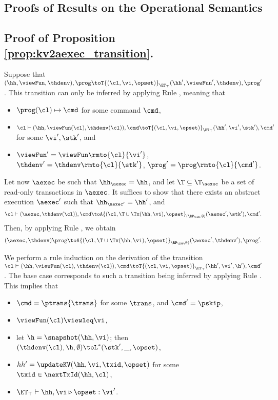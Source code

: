 \subsection{Proofs of Results on the Operational Semantics}

\subsection{Proof of Proposition \ref{prop:kv2aexec_transition}.}
\label{sec:kv2aexec-transaction}

Suppose that $(\hh, \viewFun, \thdenv), \prog \toT{(\cl, \vi, \opset)}_{\ET_{\top}} (\hh', \viewFun', \thdenv), \prog'$. 
This transition can only be inferred by applying Rule , meaning that 
\begin{itemize}
\item $\prog(\cl) \mapsto \cmd$ for some command $\cmd$, 
\item $\cl \vdash (\hh, \viewFun(\cl), \thdenv(\cl)), \cmd \toT{(\cl, \vi, \opset)}_{\ET_{\top}} (\hh', \vi', \stk'), \cmd'$ 
for some $\vi', \stk'$, and 
\item $\viewFun' = \viewFun\rmto{\cl}{\vi'}$, $\thdenv' = \thdenv\rmto{\cl}{\stk'}$, $\prog' = \prog\rmto{\cl}{\cmd'}$. 
\end{itemize}
Let now $\aexec$ be such that $\hh_{\aexec} = \hh$, and let $\T \subseteq \T_{\aexec}$ be a set of read-only 
transactions in $\aexec$. It suffices to show that there exists an abstract execution $\aexec'$ such that 
$\hh_{\aexec'} = \hh'$, and 
\[
\cl \vdash (\aexec, \thdenv(\cl)), \cmd \toA{(\cl, \T \cup \Tx(\hh, \vi), \opset}_{(\RP_{\LWW}, \emptyset)} (\aexec', \stk'), \cmd'.
\]
Then, by applying Rule , we obtain 
\[ 
(\aexec, \thdenv) \prog \toA{(\cl, \T \cup \Tx(\hh,\vi), \opset)}_{\RP_{\LWW}, \emptyset)} (\aexec' ,\thdenv'), \prog'.
\]

We perform a rule induction on the derivation of the transition $\cl \vdash (\hh, \viewFun(\cl), \thdenv(\cl)), \cmd \toT{(\cl, \vi, \opset)}_{\ET_{\top}} (\hh', \vi', \h'), \cmd'$. 
The base case corresponds to such a transition being inferred by applying Rule . 
This implies that 
\begin{itemize}
\item $\cmd = \ptrans{\trans}$ for some $\trans$, and $\cmd' = \pskip$,
\item $\viewFun(\cl) \viewleq \vi$, 
\item let $\h = \snapshot(\hh, \vi)$; then $(\thdenv(\cl), \h, \emptyset) \toL^{\ast} (\stk', \_, \opset)$, 
\item $hh' = \updateKV(\hh, \vi, \txid, \opset)$ for some $\txid \in \nextTxId(\hh, \cl)$, 
\item $\ET_{\top} \vdash \hh, \vi \triangleright \opset: \vi'$.
\end{itemize}

